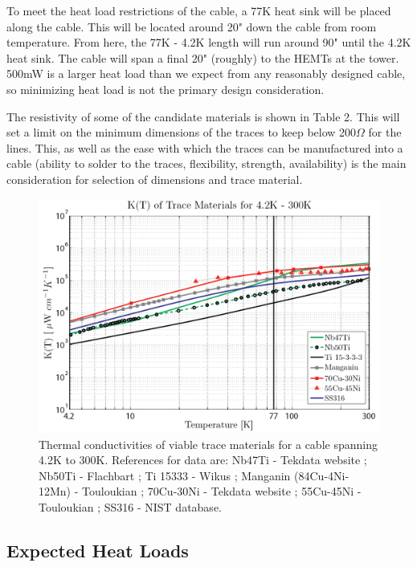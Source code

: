 \documentclass{article}
\begin{document}
To meet the heat load restrictions of the cable, a 77K heat sink will be placed along the cable. This will be located around 20" down the cable from room temperature. From here, the 77K - 4.2K length will run around 90" until the 4.2K heat sink. The cable will span a final 20" (roughly) to the HEMTs at the tower. 500mW is a larger heat load than we expect from any reasonably designed cable, so minimizing heat load is not the primary design consideration.


The resistivity of some of the candidate materials is shown in Table 2. This will set a limit on the minimum dimensions of the traces to keep below 200$\Omega$ for the lines. This, as well as the ease with which the traces can be manufactured into a cable (ability to solder to the traces, flexibility, strength, availability) is the main consideration for selection of dimensions and trace material.

\begin{figure}
\includegraphics[width = .65\textwidth]{Trace_matl_300K.png}
\caption{Thermal conductivities of viable trace materials for a cable spanning 4.2K to 300K. References for data are: \newline Nb47Ti - Tekdata website ; Nb50Ti - Flachbart \cite{Flachbart1978} ; Ti 15333 - Wikus \cite{wik} ; Manganin (84Cu-4Ni-12Mn) - Touloukian \cite{tou} ; 70Cu-30Ni - Tekdata website ; 55Cu-45Ni - Touloukian \cite{tou} ; SS316 - NIST database.}
\end{figure}

\subsection{Expected Heat Loads}
\end{document}
